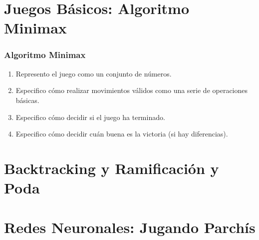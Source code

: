 \documentclass[a4paper,t,xcolor=pst,dvips,colortheme]{beamer}
\begin{document}
\section{Juegos Básicos: Algoritmo Minimax}

\begin{frame}[c]
    \frametitle{Algoritmo Minimax}
    \begin{enumerate}[<+->]
        \item Represento el juego como un conjunto de números.
        \item Especifico cómo realizar movimientos válidos como una serie de operaciones básicas.
        \item Especifico cómo decidir si el juego ha terminado. 
        \item Especifico cómo decidir cuán buena es la victoria (si hay diferencias).
    \end{enumerate}
\end{frame}




\section{Backtracking y Ramificación y Poda}

\section{Redes Neuronales: Jugando Parchís}
\end{document}
